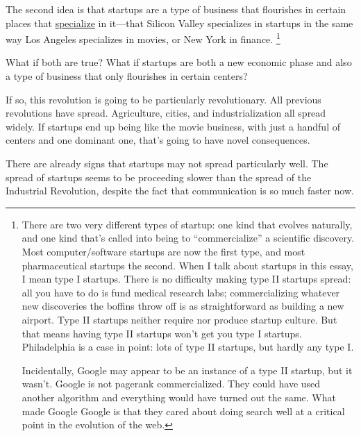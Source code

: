 \documentclass[12pt]{book}
\begin{document}
The second idea is that startups are a type of business that flourishes
in certain places that \href{startuphubs.html}{specialize} in it---that
Silicon Valley specializes in startups in the same way Los Angeles
specializes in movies, or New York in finance. \footnote{There are two very different types of startup: one kind that
evolves naturally, and one kind that's called into being to
``commercialize'' a scientific discovery. Most computer/software
startups are now the first type, and most pharmaceutical startups the
second. When I talk about startups in this essay, I mean type I
startups. There is no difficulty making type II startups spread: all you
have to do is fund medical research labs; commercializing whatever new
discoveries the boffins throw off is as straightforward as building a
new airport. Type II startups neither require nor produce startup
culture. But that means having type II startups won't get you type I
startups. Philadelphia is a case in point: lots of type II startups, but
hardly any type I.

Incidentally, Google may appear to be an instance of a type II startup,
but it wasn't. Google is not pagerank commercialized. They could have
used another algorithm and everything would have turned out the same.
What made Google Google is that they cared about doing search well at a
critical point in the evolution of the web.}

What if both are true? What if startups are both a new economic phase
and also a type of business that only flourishes in certain centers?

If so, this revolution is going to be particularly revolutionary. All
previous revolutions have spread. Agriculture, cities, and
industrialization all spread widely. If startups end up being like the
movie business, with just a handful of centers and one dominant one,
that's going to have novel consequences.

There are already signs that startups may not spread particularly well.
The spread of startups seems to be proceeding slower than the spread of
the Industrial Revolution, despite the fact that communication is so
much faster now.
\end{document}

